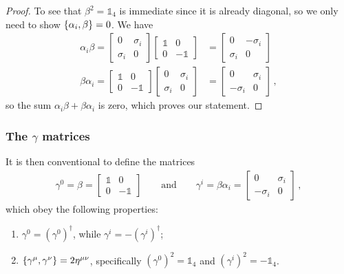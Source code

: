 \documentclass[main.tex]{subfiles}
\begin{document}
\begin{proof}
To see that \(\beta^2 = \mathbb{1}_{4}\) is immediate since it is already diagonal, so we only need to show \(\qty{\alpha_{i}, \beta } = 0\). We have 
%
\begin{align}
\alpha_{i} \beta =
\left[\begin{array}{cc}
0 & \sigma_{i} \\ 
\sigma_{i} & 0
\end{array}\right]
\left[\begin{array}{cc}
\mathbb{1} & 0 \\ 
0 & -\mathbb{1}
\end{array}\right]
&= 
\left[\begin{array}{cc}
0 & -\sigma_{i} \\ 
\sigma_{i} & 0
\end{array}\right] \\
\beta \alpha_{i} =
\left[\begin{array}{cc}
\mathbb{1} & 0 \\ 
0 & -\mathbb{1}
\end{array}\right]
\left[\begin{array}{cc}
0 & \sigma_{i} \\ 
\sigma_{i} & 0
\end{array}\right]
&= 
\left[\begin{array}{cc}
0 & \sigma_{i} \\ 
-\sigma_{i} & 0
\end{array}\right]
\,,
\end{align}
%
so the sum \(\alpha_{i} \beta + \beta \alpha_{i}\) is zero, which proves our statement. 
\end{proof}

\subsubsection{The \(\gamma \) matrices}

It is then conventional to define the matrices 
%
\begin{align}
\gamma^{0} = \beta = \left[\begin{array}{cc}
\mathbb{1} & 0 \\ 
0 & -\mathbb{1}
\end{array}\right]
\qquad \text{and} \qquad
\gamma^{i} = \beta \alpha_{i} = \left[\begin{array}{cc}
0 & \sigma_{i} \\ 
-\sigma_{i} & 0
\end{array}\right]
\,,
\end{align}
%
which obey the following properties: 
\begin{enumerate}
  \item \(\gamma^{0} = (\gamma^{0}) ^\dag\), while \(\gamma^{i} = - (\gamma^{i} ) ^\dag\);
  \item \(\qty{\gamma^{\mu }, \gamma^{\nu }} = 2 \eta^{\mu \nu }\), specifically \((\gamma^{0})^2 = \mathbb{1}_{4}\) and \((\gamma^{i})^2 = - \mathbb{1}_{4}\). 
\end{enumerate}
\end{document}
